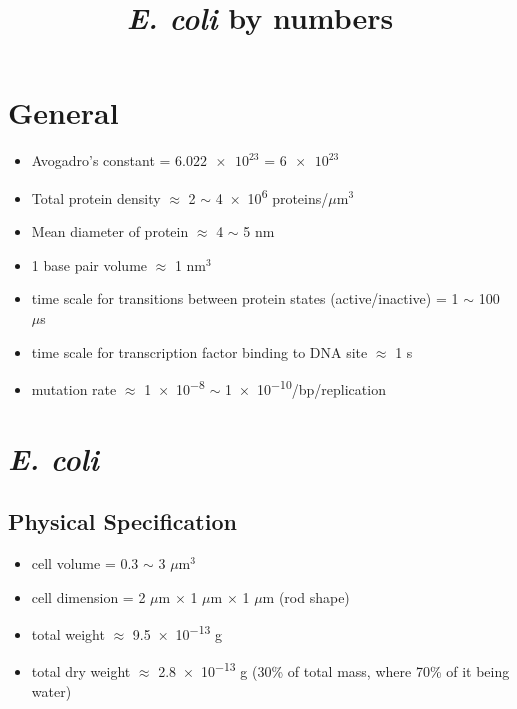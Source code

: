 \documentclass{article}
\title{\textit{E. coli} by numbers}
\author{}
\begin{document}
    \maketitle

    \section{General}
    \begin{itemize}
        \gdef\NA{6.022e23}
        \item Avogadro's constant = $\num{6.022e23}$ = $\num{6e23}$
        \item Total protein density $\approx$ 2 $\sim$ \num{4e6} \space proteins/$\mu$m$^{3}$
        \item Mean diameter of protein $\approx$ 4 $\sim$ 5 nm
        \item 1 base pair volume $\approx$ 1 nm$^{3}$
        \item time scale for transitions between protein states (active/inactive) = 1 $\sim$ 100 $\mu$s
        \item time scale for transcription factor binding to DNA site $\approx$ 1 s
        \item mutation rate $\approx$ \num{1e-8} $\sim$ \num{1e-10}/bp/replication
    \end{itemize}

    \section{\textit{E. coli}}
        \subsection{Physical Specification}
        \gdef\Volume{1e-18}
        \begin{itemize}
            \item cell volume = 0.3 $\sim$ 3 $\mu$m$^{3}$  
            \item cell dimension = 2 $\mu$m $\times$ 1 $\mu$m $\times$ 1 $\mu$m (rod shape)
            \item total weight $\approx$ \num{9.5e-13} g %
            \item total dry weight $\approx$ \num{2.8e-13} g (30\% of total mass, where 70\% of it being water) %
        \end{itemize} 
\end{document}
